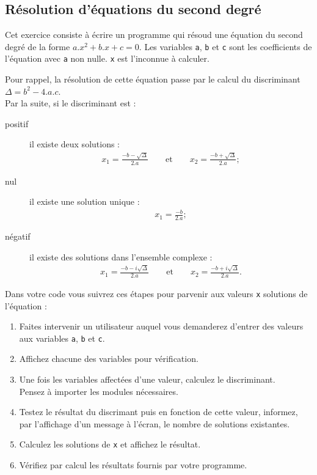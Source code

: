 
\subsection{Résolution d'équations du second degré}

Cet exercice consiste à écrire un programme qui résoud une équation du second degré de la forme
$a.x^2+b.x+c = 0$.
Les variables \texttt{a}, \texttt{b} et \texttt{c} sont les coefficients de l'équation
avec \texttt{a} non nulle. \texttt{x} est l'inconnue à calculer.

Pour rappel, la résolution de cette équation passe par le calcul du discriminant
$\Delta = b^2-4.a.c$.\\
Par la suite, si le discriminant est :
\begin{description}
\item[positif] il existe deux solutions :
\begin{eqnarray*}
  x_1 = \frac{-b-\sqrt{\Delta}}{2.a} \qquad \textrm{et} \qquad x_2=\frac{-b+\sqrt{\Delta}}{2.a};
\end{eqnarray*}
\item[nul] il existe une solution unique :
\begin{eqnarray*}
  x_1 = \frac{-b}{2.a};
\end{eqnarray*}
\item[négatif] il existe des solutions dans l'ensemble complexe :
\begin{eqnarray*}
  x_1 = \frac{-b-i\sqrt{\Delta}}{2.a} \qquad \textrm{et} \qquad x_2=\frac{-b+i\sqrt{\Delta}}{2.a}.
\end{eqnarray*}
\end{description}


Dans votre code vous suivrez ces étapes pour parvenir aux valeurs \texttt{x} solutions de l'équation :
\begin{enumerate}
\item Faites intervenir un utilisateur auquel vous demanderez d'entrer des valeurs aux
  variables \texttt{a}, \texttt{b} et \texttt{c}.
\item Affichez chacune des variables pour vérification.
\item Une fois les variables affectées d'une valeur, calculez le discriminant.\\
  Pensez à importer les modules nécessaires.
\item Testez le résultat du discrimant puis en fonction de cette valeur, informez,
  par l'affichage d'un message à l'écran, le nombre de solutions existantes.
\item Calculez les solutions de \texttt{x} et affichez le résultat.
\item Vérifiez par calcul les résultats fournis par votre programme.

\end{enumerate}
